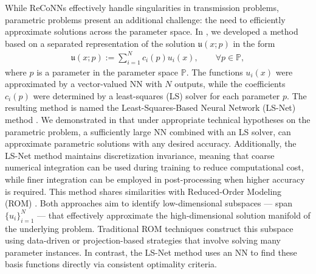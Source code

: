 \documentclass[oneside]{article}
\begin{document}
While ReCoNNs effectively handle singularities in transmission problems, parametric problems present an additional challenge: the need to efficiently approximate solutions across the parameter space. In \cite{baharlouei2024least}, we developed a method based on a separated representation of the solution $\mathfrak{u}(x ; p)$ in the form
\begin{align}
    \mathfrak{u}(x ; p) := \sum _{i = 1}^N c_i (p) u_i(x)
    , \qquad \forall p \in \mathbb{P},
    \label{eq2_PGD_decomposition}
\end{align} 
where $p$ is a parameter in the parameter space $\mathbb{P}$. The functions $u_i(x)$ were approximated by a vector-valued NN with $N$ outputs, while the coefficients $c_i(p)$ were determined by a least-squares (LS) solver for each parameter $p$. The resulting method is named the Least-Squares-Based Neural Network (LS-Net) method \cite{baharlouei2024least}. We demonstrated in \cite{baharlouei2024least} that under appropriate technical hypotheses on the parametric problem, a sufficiently large NN  combined with an LS solver, can approximate parametric solutions with any desired accuracy. Additionally, the LS-Net method maintains discretization invariance, meaning that coarse numerical integration can be used during training to reduce computational cost, while finer integration can be employed in post-processing when higher accuracy is required. This method shares similarities with Reduced-Order Modeling (ROM) \cite{azeez2001proper, rozza2008reduced, chinesta2011short}. Both approaches aim to identify low-dimensional subspaces --- span $\{u_i\}_{i=1}^N$ --- that effectively approximate the high-dimensional solution manifold of the underlying problem. Traditional ROM techniques construct this subspace using data-driven or projection-based strategies that involve solving many parameter instances. In contrast, the LS-Net method uses an NN to find these basis functions directly via consistent optimality criteria.


\end{document}
